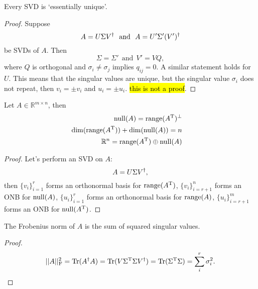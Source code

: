 \documentclass{article}
\begin{document}
\begin{theorem}
    Every SVD is `essentially unique'.
\end{theorem}
\begin{proof}
    Suppose
    \begin{equation}
        A=U\Sigma V\adj\ \ \mathrm{and}\ \ A=U'\Sigma' (V')\adj
    \end{equation}
    be SVDs of $A$. Then
    \begin{equation}
        \Sigma=\Sigma'\ \ \mathrm{and}\ \ V'=VQ,
    \end{equation}
    where $Q$ is orthogonal and $\sigma_i\neq\sigma_j$ implies $q_{ij}=0$. A similar statement holds for $U$. This means that the singular values are unique, but the singular value $\sigma_i$ does not repeat, then $v_i=\pm v_i$ and $u_i=\pm u_i$. \hl{this is not a proof}.
\end{proof}

\begin{theorem}
    Let $A\in\mathbb{R}^{m\times n}$, then
    \begin{align}
        \nulll(A)=\range(A\tp)^{\perp}&\ \ \ \\
        \dim(\range(A\tp))+\dim(\nulll(A))=n&\ \ \ \\\
        \mathbb{R}^n=\range(A\tp)\oplus\nulll(A)&\ \ \ 
    \end{align}
\end{theorem}
\begin{proof}
    Let's perform an SVD on $A$:
    \begin{equation}
        A = U\Sigma V^{\dagger},
    \end{equation}
    then $\{v_i\}_{i=1}^r$ forms an orthonormal basis for $\operatorname{range}(A^{\text{T}})$, $\{v_i\}_{i=r+1}^{n}$ forms an ONB for $\operatorname{null}(A)$, $\{u_i\}_{i=1}^r$ forms an orthonormal basis for $\operatorname{range}(A)$, $\{u_i\}_{i=r+1}^{m}$ forms an ONB for $\operatorname{null}(A^{\text{T}})$.

\end{proof}

\begin{theorem}
    The Frobenius norm of $A$ is the sum of squared singular values.
\end{theorem}
\begin{proof}
\begin{equation}
    ||A||^2_{\mathrm{F}}=\operatorname{Tr}(A^{\dagger} A)=\operatorname{Tr}(V\Sigma^{\text{T}}\Sigma V^{\dagger})=\operatorname{Tr}(\Sigma^{\text{T}}\Sigma)=\sum_i^r\sigma_i^2.
\end{equation}
\end{proof}
\end{document}
